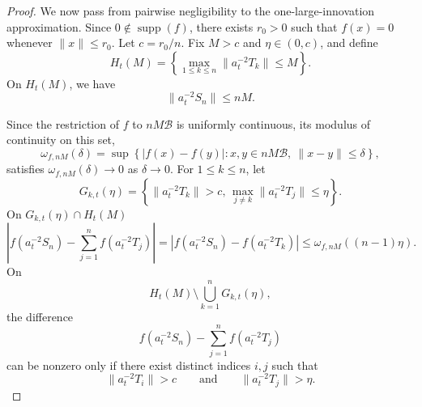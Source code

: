 \documentclass[10pt,a4paper]{amsart}
\newcommand{\Bcal}{\mathcal{B}}
\newcommand{\Tbf}{{ T}}
\newcommand{\xbf}{{ x}}
\newcommand{\ybf}{{ y}}
\begin{document}
\begin{proof}
    We now pass from pairwise negligibility to the one-large-innovation
    approximation. 
    Since $0\notin\operatorname{supp}(f)$, there exists $r_0>0$ such that $f(\xbf)=0$ whenever $\|\xbf\|\leq r_0$.
    Let $c=r_0/n$.
    Fix $M>c$ and $\eta\in(0,c)$, and define
    \begin{equation*}
      H_t(M)
      =
      \left\{
        \max_{1\leq k\leq n}\|a_t^{-2}\Tbf_{k}\|\leq M
      \right\}.
    \end{equation*}
    On $H_t(M)$, we have
    \begin{equation*}
      \|a_t^{-2}S_n\|\leq nM.
    \end{equation*}

    Since the restriction of $f$ to $nM\Bcal$ is uniformly continuous,
    its modulus of continuity on this set,
    \begin{equation*}
      \omega_{f,nM}(\delta)
      =
      \sup\left\{
        |f(\xbf)-f(\ybf)|:
        \xbf,\ybf\in nM\Bcal,\ 
        \|\xbf-\ybf\|\leq\delta
      \right\},
    \end{equation*}
    satisfies $\omega_{f,nM}(\delta)\to 0$ as $\delta\to 0$.
    For $1\leq k\leq n$, let
    \begin{equation*}
      G_{k,t}(\eta)
      =
      \left\{
        \|a_t^{-2}\Tbf_{k}\|>c,\,
        \max_{j\neq k}\|a_t^{-2}\Tbf_{j}\|\leq\eta
      \right\}.
    \end{equation*}
    On $G_{k,t}(\eta)\cap H_t(M)$
    \begin{equation*}
      \left|
        f(a_t^{-2}S_n)-\sum_{j=1}^nf(a_t^{-2}\Tbf_{j})
      \right| 
      = \left|
        f(a_t^{-2}S_n)-f(a_t^{-2}\Tbf_{k})
      \right| 
      \leq\omega_{f,nM}((n-1)\eta).
    \end{equation*}
    On
    \begin{equation*}
      H_t(M)\setminus\bigcup_{k=1}^nG_{k,t}(\eta),
    \end{equation*}
    the difference
    \begin{equation*}
       f(a_t^{-2}S_n)-\sum_{j=1}^nf(a_t^{-2}\Tbf_{j})   \end{equation*}
    can be nonzero only if there exist distinct indices $i,j$ such that
    \begin{equation*}
      \|a_t^{-2}\Tbf_{i}\|>c
      \qquad\text{and}\qquad
      \|a_t^{-2}\Tbf_{j}\|>\eta.
    \end{equation*}


\end{proof}
\end{document}
